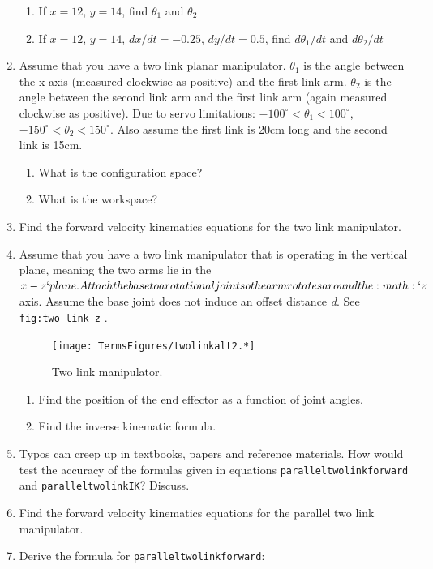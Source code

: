 \begin{enumerate}
  \begin{enumerate}
  \tightlist
  \item
    If \(x = 12\), \(y = 14\), find \(\theta_1\) and \(\theta_2\)
  \item
    If \(x = 12\), \(y = 14\), \(dx/dt = -0.25\), \(dy/dt = 0.5\), find
    \(d\theta_1/dt\) and \(d\theta_2/dt\)
  \end{enumerate}
\item
  Assume that you have a two link planar manipulator. \(\theta_1\) is
  the angle between the x axis (measured clockwise as positive) and the
  first link arm. \(\theta_2\) is the angle between the second link arm
  and the first link arm (again measured clockwise as positive). Due to
  servo limitations: \(-100^\circ < \theta_1 < 100^\circ\),
  \(-150^\circ < \theta_2 < 150^\circ\). Also assume the first link is
  20cm long and the second link is 15cm.

  \begin{enumerate}
  \def\labelenumii{\alph{enumii}.}
  \tightlist
  \item
    What is the configuration space?
  \item
    What is the workspace?
  \end{enumerate}
\item
  Find the forward velocity kinematics equations for the two link
  manipulator.
\item
  Assume that you have a two link manipulator that is operating in the
  vertical plane, meaning the two arms lie in the
  \(x-z`plane. Attach the base to a rotational joint so the
  arm rotates around the :math:`z\) axis. Assume the base joint does not
  induce an offset distance \emph{d}. See \texttt{fig:two-link-z} .

  \leavevmode\hypertarget{fig:two-link-z}{}%
  \begin{figure}
  \centering
  \texttt{[image: TermsFigures/twolinkalt2.*]}
  \caption{Two link manipulator.}
  \end{figure}

  \begin{enumerate}
  \def\labelenumii{\alph{enumii}.}
  \tightlist
  \item
    Find the position of the end effector as a function of joint angles.
  \item
    Find the inverse kinematic formula.
  \end{enumerate}
\item
  Typos can creep up in textbooks, papers and reference materials. How
  would test the accuracy of the formulas given in equations
  \texttt{paralleltwolinkforward} and \texttt{paralleltwolinkIK}?
  Discuss.
\item
  Find the forward velocity kinematics equations for the parallel two
  link manipulator.
\item
  Derive the formula for \texttt{paralleltwolinkforward}:


\end{enumerate}
